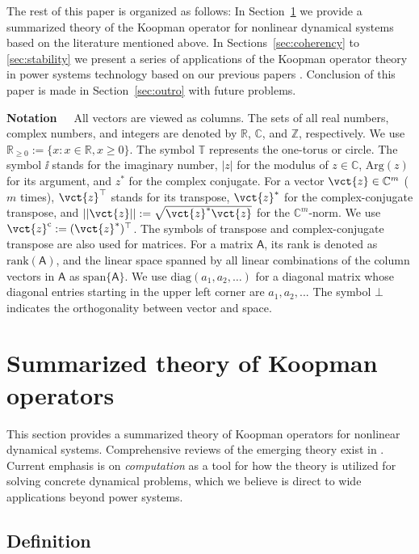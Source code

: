 \documentclass[a4paper,10pt]{article}
\def\bbR{{\mathbb{R}}}
\def\bbZ{{\mathbb{Z}}}
\def\bbC{{\mathbb{C}}}
\begin{document}
%
The rest of this paper is organized as follows:  
In Section~\ref{sec:theory} we provide a summarized theory of the Koopman operator for nonlinear dynamical systems based on the literature mentioned above.  
In Sections~\ref{sec:coherency} to \ref{sec:stability} we present a series of applications of the Koopman operator theory in power systems technology based on our previous papers \cite{Susuki_IEEETPWRS26,Susuki_IEEETPWRS27,Susuki_IEEETPWRS29}. 
Conclusion of this paper is made in Section~\ref{sec:outro} with future problems.  

%
\textbf{Notation}~~~All vectors are viewed as columns.  
The sets of all real numbers, complex numbers, and integers are denoted by $\bbR$, $\bbC$, and $\bbZ$, respectively. 
We use $\mathbb{R}_{\geq 0}:=\{x : x\in\bbR, x\geq 0\}$.  
The symbol $\mathbb{T}$ represents the one-torus or circle.  
The symbol $\ii$ stands for the imaginary number, $|z|$ for the modulus of $z\in\bbC$, $\mathrm{Arg}(z)$ for its argument, and $z^\ast$ for the complex conjugate.  
For a vector $\vct{z}\in\bbC^m$ ($m$ times), $\vct{z}^\top$ stands for its transpose, $\vct{z}^\ast$ for the complex-conjugate transpose, and $||\vct{z}||:=\sqrt{\vct{z}^\ast\vct{z}}$ for the $\bbC^m$-norm.  
We use $\vct{z}^\mathrm{c}:=(\vct{z}^\ast)^\top$.   
The symbols of transpose and complex-conjugate transpose are also used for matrices.  
For a matrix $\mathsf{A}$, its rank is denoted as $\mathrm{rank}(\mathsf{A})$, and the linear space spanned by all linear combinations of the column vectors in $\mathsf{A}$ as $\mathrm{span}\{\mathsf{A}\}$.  
We use $\mathrm{diag}(a_1,a_2,\ldots)$ for a diagonal matrix whose diagonal entries starting in the upper left corner are $a_1,a_2,...$
The symbol $\bot$ indicates the orthogonality between vector and space.  


\section{Summarized theory of Koopman operators}
\label{sec:theory}

This section provides a summarized theory of Koopman operators for nonlinear dynamical systems.  
Comprehensive reviews of the emerging theory exist in \cite{Marko_CHAOS22,Mezic_ARFM45}.  
Current emphasis is on \emph{computation} as a tool for how the theory is utilized for solving concrete dynamical problems, 
which we believe is direct to wide applications beyond power systems.  


\subsection{Definition}
\label{subsec:def}
\end{document}
